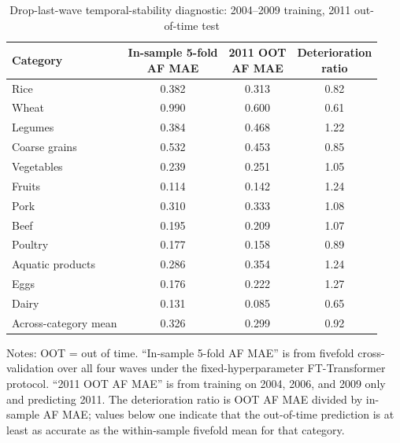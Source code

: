 \documentclass[preprint,12pt,authoryear]{elsarticle}
\newcommand{\AF}{\mathrm{AF}}
\begin{document}
\begin{table}[htbp]
\centering
\begin{threeparttable}
\caption{Drop-last-wave temporal-stability diagnostic: 2004--2009 training, 2011 out-of-time test}
\label{tab:temporal}
\small
\setlength{\tabcolsep}{0pt} 
\begin{tabular*}{\textwidth}{@{\extracolsep{\fill}} lccc @{}}
\toprule
Category & \shortstack{In-sample 5-fold\\AF MAE} & \shortstack{2011 OOT\\AF MAE} & \shortstack{Deterioration\\ratio} \\
\midrule
Rice             & 0.382 & 0.313 & 0.82 \\
Wheat            & 0.990 & 0.600 & 0.61 \\
Legumes          & 0.384 & 0.468 & 1.22 \\
Coarse grains    & 0.532 & 0.453 & 0.85 \\
Vegetables       & 0.239 & 0.251 & 1.05 \\
Fruits           & 0.114 & 0.142 & 1.24 \\
Pork             & 0.310 & 0.333 & 1.08 \\
Beef             & 0.195 & 0.209 & 1.07 \\
Poultry          & 0.177 & 0.158 & 0.89 \\
Aquatic products & 0.286 & 0.354 & 1.24 \\
Eggs             & 0.176 & 0.222 & 1.27 \\
Dairy            & 0.131 & 0.085 & 0.65 \\
\midrule
\addlinespace
Across-category mean & 0.326 & 0.299 & 0.92 \\
\bottomrule
\end{tabular*}
\begin{tablenotes}[flushleft]
\scriptsize
\item Notes: OOT = out of time. ``In-sample 5-fold AF MAE'' is from fivefold cross-validation over all four waves under the fixed-hyperparameter FT-Transformer protocol. ``2011 OOT AF MAE'' is from training on 2004, 2006, and 2009 only and predicting 2011. The deterioration ratio is OOT AF MAE divided by in-sample AF MAE; values below one indicate that the out-of-time prediction is at least as accurate as the within-sample fivefold mean for that category.
\end{tablenotes}
\end{threeparttable}
\end{table}
\end{document}
